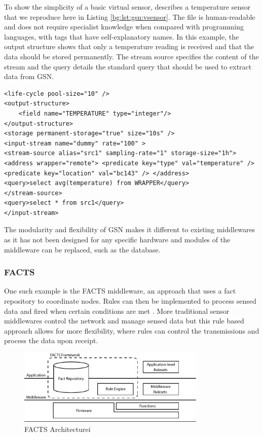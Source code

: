 To show the simplicity of a basic virtual sensor, \cite{Aberer2007} describes a temperature sensor that we reproduce here in Listing \ref{bg:lst:gsn:vsensor}. The file is human-readable and does not require specialist knowledge when compared with programming languages, with tags that have self-explanatory names. In this example, the output structure shows that only a temperature reading is received and that the data should be stored permanently. The stream source specifies the content of the stream and the query details the standard query that should be used to extract data from GSN.

\begin{lstlisting}[caption={Example Virtual Sensor},label={bg:lst:gsn:vsensor}]
<life-cycle pool-size="10" />
<output-structure> 
	<field name="TEMPERATURE" type="integer"/> 
</output-structure>
<storage permanent-storage="true" size="10s" /> 
<input-stream name="dummy" rate="100" > 
<stream-source alias="src1" sampling-rate="1" storage-size="1h">
<address wrapper="remote"> <predicate key="type" val="temperature" /> <predicate key="location" val="bc143" /> </address> 
<query>select avg(temperature) from WRAPPER</query>
</stream-source>
<query>select * from src1</query> 
</input-stream>

\end{lstlisting}

The modularity and flexibility of GSN makes it different to existing middlewares as it has not been designed for any specific hardware and modules of the middleware can be replaced, such as the database. 



	\subsubsection{FACTS}
		One such example is the FACTS middleware, an approach that uses a fact repository to coordinate nodes. Rules can then be implemented to process sensed data and fired when certain conditions are met \cite{Terfloth2006}. More traditional sensor middlewares control the network and manage sensed data but this rule based approach allows for more flexibility, where rules can control the transmissions and process the data upon receipt.

		\begin{figure}[h]
		\centering
		\includegraphics[width=0.8\textwidth]{Chap2/figures/facts_architecture}
		\caption{FACTS Architecturei \cite{Terfloth2006}}
		\label{bg:fig:facts}
		\end{figure}

